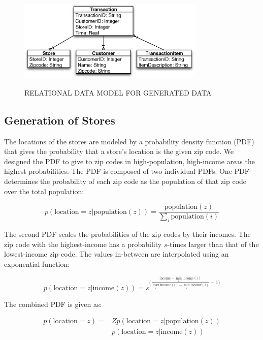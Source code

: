 \begin{figure}[!t]
  \centering
  \caption{\uppercase{Relational Data Model for Generated Data}}
  \includegraphics[width=3.5in]{figures/bigpetstore/transactions_data_model.eps}
  \label{fig:relational-data-model}
\end{figure}

\subsection{Generation of Stores}
The locations of the stores are modeled by a probability density function (PDF) that gives the probability that a store's location is the given zip code. We designed the PDF to give to zip codes in high-population, high-income areas the highest probabilities. The PDF is composed of two individual PDFs. One PDF determines the probability of each zip code as the population of that zip code over the total population:

\begin{equation*}
p(\text{location}=z | \text{population}(z)) = \frac{\text{population}(z)}{\sum_{i} \text{population}(i)}
\end{equation*}

The second PDF scales the probabilities of the zip codes by their incomes.  The zip code with the highest-income has a probability $s$-times larger than that of the lowest-income zip code. The values in-between are interpolated using an exponential function:

\begin{equation*}
p(\text{location}=z | \text{income}(z)) = s ^ {\big( \frac{\text{income} - \min_i{\textrm{income}(i)}} {\max_i{\textrm{income}(i)} - \min_i{\textrm{income}(i)}} - 1 \big)}
\end{equation*}

The combined PDF is given as: 

\begin{align*}
p(\text{location}=z) = &Z p(\text{location}=z | \text{population}(z)) \\
&p(\text{location}=z | \text{income}(z))
\end{align*}

